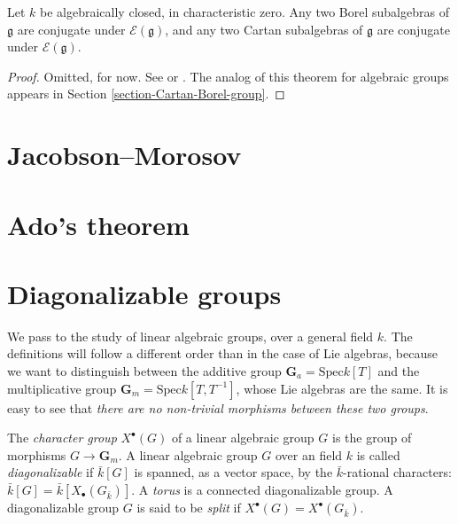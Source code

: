 \begin{theorem}
\label{theorem-conjugacy-Borel-Cartan}
 Let $k$ be algebraically closed, in characteristic zero. Any two Borel subalgebras of $\mathfrak g$ are conjugate under $\mathcal E(\mathfrak g)$, and any two Cartan subalgebras of $\mathfrak g$ are conjugate under $\mathcal E(\mathfrak g)$.
\end{theorem}

\begin{proof}
 Omitted, for now. See \cite{Humphreys-Lie} or \cite{Sternberg}. The analog of this theorem for algebraic groups appears in Section \ref{section-Cartan-Borel-group}.
\end{proof}




\section{Jacobson--Morosov}
\label{section-Jacobson-Morosov}

\section{Ado's theorem}
\label{section-Ado}


\section{Diagonalizable groups}
\label{section-diagonalizable-groups}

We pass to the study of linear algebraic groups, over a general field $k$. The definitions will follow a different order than in the case of Lie algebras, because we want to distinguish between the additive group $\mathbf G_a = \text{Spec} k[T]$ and the multiplicative group $\mathbf G_m = \text{Spec} k[T,T^{-1}]$, whose Lie algebras are the same. It is easy to see that \emph{there are no non-trivial morphisms between these two groups}. 


\begin{definition}
\label{definition-characters-diagonalizable-group} 
The {\it character group} $X^\bullet(G)$ of a linear algebraic group $G$ is the group of morphisms $G\to \mathbf G_m$. 
A linear algebraic group $G$ over an field $k$ is called \emph{diagonalizable} if $\bar k[G]$ is spanned, as a vector space, by the $\bar k$-rational characters: $\bar k[G] = \bar k[X_\bullet(G_{\bar k})]$. A {\it torus} is a connected diagonalizable group. A diagonalizable group $G$ is said to be {\it split} if $X^\bullet(G) = X^\bullet(G_{\bar k})$.
\end{definition}

